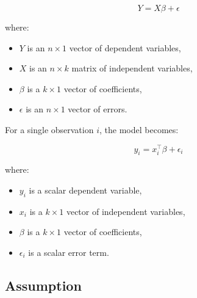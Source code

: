 \documentclass[11pt]{article}
\begin{document}
\[
Y = X \beta + \epsilon
\]

where:
\begin{itemize}
    \item \(Y\) is an \(n \times 1\) vector of dependent variables,
    \item \(X\) is an \(n \times k\) matrix of independent variables,
    \item \(\beta\) is a \(k \times 1\) vector of coefficients,
    \item \(\epsilon\) is an \(n \times 1\) vector of errors.
\end{itemize}

For a single observation \(i\), the model becomes:

\[
y_i = x_i^\top \beta + \epsilon_i
\]

where:
\begin{itemize}
    \item \(y_i\) is a scalar dependent variable,
    \item \(x_i\) is a \(k \times 1\) vector of independent variables,
    \item \(\beta\) is a \(k \times 1\) vector of coefficients,
    \item \(\epsilon_i\) is a scalar error term.
\end{itemize}

\subsection{Assumption}
\end{document}
